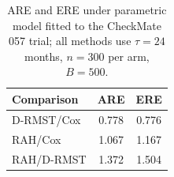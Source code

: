 \begin{table}[ht]
\centering
\caption{ARE and ERE under parametric model fitted to the CheckMate 057 trial; all methods use $\tau=24$ months, $n=300$ per arm, $B=500$.}
\label{tab:cm057-are-ere}
\begin{tabular}{lcc}
\toprule
Comparison & ARE & ERE
\\
\midrule
D-RMST/Cox & 0.778 & 0.776 \\
RAH/Cox & 1.067 & 1.167 \\
RAH/D-RMST & 1.372 & 1.504 \\
\bottomrule
\end{tabular}
\end{table}
